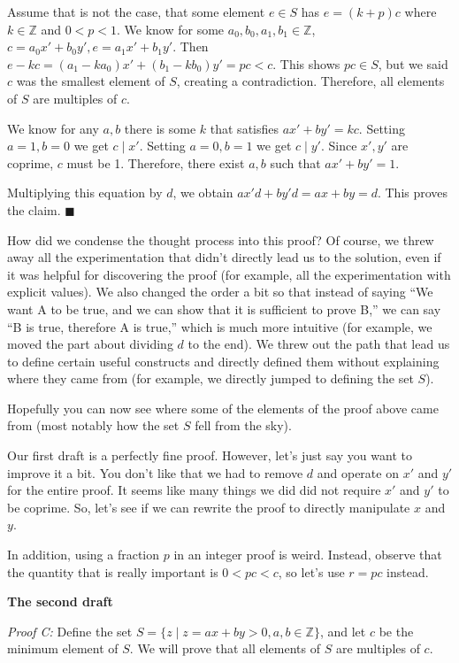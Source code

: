 \documentclass[11pt]{article}
\begin{document}
    Assume that is not the case, that some element $e\in S$ has $e=(k+p)c$ where
    $k\in\mathbb Z$ and $0<p<1$. We know for some $a_0,b_0,a_1,b_1\in\mathbb Z$,
    $c=a_0x'+b_0y',e=a_1x'+b_1y'$. Then $e-kc=(a_1-ka_0)x'+(b_1-kb_0)y'=pc<c$. This
    shows $pc\in S$, but we said $c$ was the smallest element of $S$, creating a 
    contradiction. Therefore, all elements of $S$ are multiples of $c$.
    
    We know for any $a,b$ there is some $k$ that satisfies $ax'+by'=kc$. Setting
    $a=1,b=0$ we get $c\mid x'$. Setting $a=0,b=1$ we get $c\mid y'$. Since $x',y'$
    are coprime, $c$ must be 1. Therefore, there exist $a,b$ such that $ax'+by'=1$.
    
    Multiplying this equation by $d$, we obtain $ax'd+by'd=ax+by=d$. This proves
    the claim. $\blacksquare$
    
    How did we condense the thought process into this proof? Of course, we threw away
    all the experimentation that didn't directly lead us to the solution, even if it
    was helpful for discovering the proof (for example, all the experimentation with
    explicit values). We also changed the order a bit so that instead of saying
    ``We want A to be true, and we can show that it is sufficient to prove B,''
    we can say ``B is true, therefore A is true,'' which is much more intuitive
    (for example, we moved the part about dividing $d$ to the end). We threw out
    the path that lead us to define certain useful constructs and directly defined 
    them without explaining where they came from (for example, we directly jumped
    to defining the set $S$).
    
    Hopefully you can now see where some of the elements of the proof above came from
    (most notably how the set $S$ fell from the sky).
    
    Our first draft is a perfectly fine proof. However, let's just say you want to
    improve it a bit. You don't like that we had to remove $d$ and operate on $x'$ and
    $y'$ for the entire proof. It seems like many things we did did not require $x'$ and
    $y'$ to be coprime. So, let's see if we can rewrite the proof to directly manipulate
    $x$ and $y$.
    
    In addition, using a fraction $p$ in an integer proof is weird. Instead, observe that
    the quantity that is really important is $0<pc<c$, so let's use $r=pc$ instead.

    \textbf{The second draft}
    
    \textit{Proof C:} Define the set $S=\{z\mid z=ax+by>0,a,b\in\mathbb Z\}$, and
    let $c$ be the minimum element of $S$. We will prove that all elements of $S$
    are multiples of $c$.
    
\end{document}
